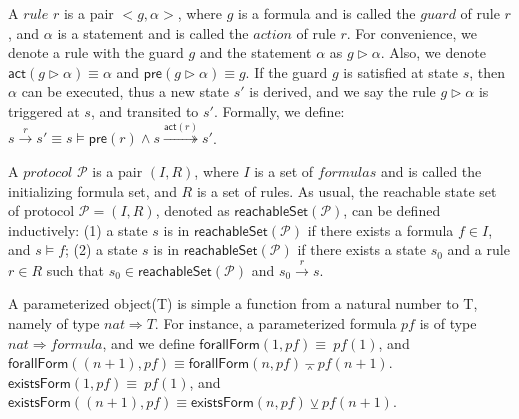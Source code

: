 \documentclass{llncs}
\def \andc {\barwedge }
\def \orc {\veebar }
\begin{document}
A $rule$ $r$ is a pair $<g,\alpha>$, where $g$ is a formula and is called the $guard$ of rule $r$, and $\alpha$ is a statement and is called the $action$ of rule $r$.
 For convenience, we denote a rule with the guard $g$ and the statement $\alpha$ as $g \vartriangleright \alpha$. Also, we denote $\mathsf{act}(g \vartriangleright \alpha)\equiv \alpha$ and $\mathsf{pre}(g \vartriangleright \alpha)\equiv g$. If the guard $g$ is satisfied at state $s$, then $\alpha$ can be executed, thus a new state $s'$ is derived, and we say the rule $g \vartriangleright \alpha$ is triggered at $s$, and transited to $s'$. Formally, we define: $s\overset{r}{\rightarrow } s' \equiv s\models \mathsf{pre}(r) \wedge s\overset{\mathsf{act}(r)}{\twoheadrightarrow } s'$.

A $protocol$ $\mathcal{P}$ is a pair $(I,R)$, where $I$ is a set of $formulas$ and is called the initializing formula  set, and $R$ is a set of rules. %
 As usual, the reachable state set of protocol  $\mathcal{P}=(I,R)$, denoted as $\mathsf{reachableSet}(\mathcal{P})$, can be defined inductively: (1) a state $s$ is in
$\mathsf{reachableSet}(\mathcal{P})$ if there exists a formula $f \in I$, and $s \models  f$; (2) a state $s$ is in
$\mathsf{reachableSet}(\mathcal{P})$ if there exists a  state $s_0$  and a rule $r \in R$ such that $s_0 \in \mathsf{reachableSet}(\mathcal{P})$ and $s_0\overset{r}{\rightarrow } s$.

A parameterized object(T) is simple a function from a natural number to T, namely of type $nat \Rightarrow T$. For instance, a parameterized formula $pf$ is of type $nat \Rightarrow formula$, and we define
$\mathsf{forallForm}(1,pf)\equiv~pf(1)$, and $\mathsf{forallForm}((n+1),pf)\equiv\mathsf{forallForm}(n,pf) \andc pf(n +1)$. $\mathsf{existsForm}(1,pf)\equiv~pf(1)$, and $\mathsf{existsForm}((n+1),pf)\equiv\mathsf{existsForm}(n,pf) \orc pf(n +1)$.
\end{document}
